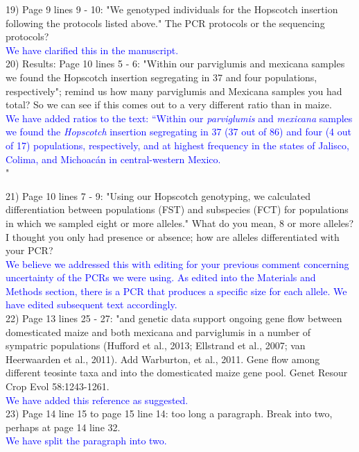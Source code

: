 \documentclass[11pt]{article}
\newcommand{\res}[1]{\noindent \textcolor{blue}{{#1}} \\}
\begin{document}
19) Page 9 lines 9 - 10: "We genotyped individuals for the Hopscotch insertion following the protocols listed above." The PCR protocols or the sequencing protocols?\\ 

\res{We have clarified this in the manuscript.}

20) Results:
Page 10 lines 5 - 6: "Within our parviglumis and mexicana samples we found the Hopscotch insertion segregating in 37 and four populations, respectively"; remind us how many parviglumis and Mexicana samples you had total? So we can see if this comes out to a very different ratio than in maize.\\ 

\res{We have added ratios to the text: ``Within our \emph{parviglumis} and \emph{mexicana} samples we found the \emph{Hopscotch} insertion segregating in 37 (37 out of 86) and four (4 out of 17) populations, respectively, and at highest frequency in the states of Jalisco, Colima, and Michoac\'{a}n in central-western Mexico.}"

21) Page 10 lines 7 - 9: "Using our Hopscotch genotyping, we calculated diﬀerentiation between populations (FST) and subspecies (FCT) for populations in which we sampled eight or more alleles." What do you mean, 8 or more alleles? I thought you only had presence or absence; how are alleles differentiated with your PCR?\\ 

\res{We believe we addressed this with editing for your previous comment concerning uncertainty of the PCRs we were using. As edited into the Materials and Methods section, there is a PCR that produces a specific size for each allele. We have edited subsequent text accordingly.}

22) Page 13 lines 25 - 27: "and genetic data support ongoing gene ﬂow between domesticated maize and both mexicana and parviglumis in a number of sympatric populations (Huﬀord et al., 2013; Ellstrand et al., 2007; van Heerwaarden et al., 2011). Add Warburton, et al., 2011.  Gene flow among different teosinte taxa and into the domesticated maize gene pool.  Genet Resour Crop Evol 58:1243-1261.\\ 

\res{We have added this reference as suggested.}

23) Page 14 line 15 to page 15 line 14: too long a paragraph. Break into two, perhaps at page 14 line 32.\\ 

\res{We have split the paragraph into two.}


\end{document}
